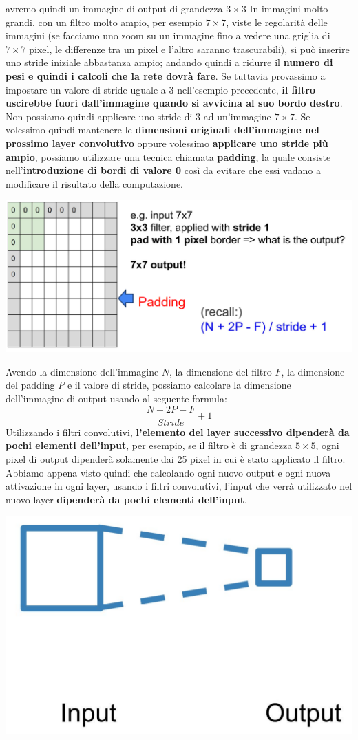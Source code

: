 \documentclass[12pt]{article}
\begin{document}
avremo quindi un immagine di output di grandezza $3 \times 3$
In immagini molto grandi, con un filtro molto ampio, per esempio $7 \times 7$, viste le regolarità delle immagini (se facciamo uno zoom su un immagine fino a vedere una griglia di $7 \times 7$ pixel, le differenze tra un pixel e l'altro saranno trascurabili), si può inserire uno stride iniziale abbastanza ampio; andando quindi
a ridurre il \textbf{numero di pesi e quindi i calcoli che la rete dovrà fare}.
Se tuttavia provassimo a impostare un valore di stride uguale a $3$ nell'esempio precedente, \textbf{il filtro uscirebbe fuori dall'immagine quando si avvicina al suo bordo destro}.
Non possiamo quindi applicare uno stride di 3 ad un'immagine $7 \times 7$.
Se volessimo quindi mantenere le \textbf{dimensioni originali dell'immagine nel prossimo layer convolutivo} oppure volessimo \textbf{applicare uno stride più ampio}, possiamo utilizzare una tecnica chiamata \textbf{padding}, la quale consiste
nell'\textbf{introduzione di bordi di valore 0} così da evitare che essi vadano a modificare il risultato della computazione.
\begin{center}
    \includegraphics[width =0.85\linewidth]{Images/159.PNG}
\end{center}
Avendo la dimensione dell'immagine $N$, la dimensione del filtro $F$, la dimensione del padding $P$ e il valore di stride, possiamo calcolare la dimensione dell'immagine di output usando al seguente formula:
$$\frac{N + 2P - F}{Stride} + 1$$
Utilizzando i filtri convolutivi, \textbf{l'elemento del layer successivo dipenderà da pochi elementi dell'input}, per esempio, se il filtro è di grandezza $5 \times 5$, ogni pixel di output dipenderà solamente dai 25 pixel in cui è stato applicato il filtro.
Abbiamo appena visto quindi che calcolando ogni nuovo output e ogni nuova attivazione in ogni layer, usando i filtri convolutivi, l'input che verrà utilizzato nel nuovo layer \textbf{dipenderà da pochi elementi dell'input}.
\begin{center}
    \includegraphics[width =0.45\linewidth]{Images/160.PNG}
\end{center}
\end{document}
